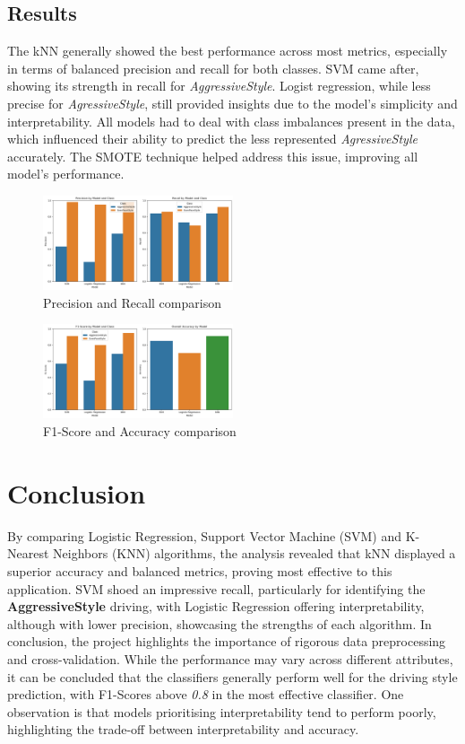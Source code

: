 \documentclass[10pt,journal,compsoc]{IEEEtran}
\begin{document}
\subsection{Results}
The kNN generally showed the best performance across most metrics, especially in terms of balanced precision and recall for both classes. SVM came after, 
showing its strength in recall for \textit{AggressiveStyle}. Logist regression, while less precise for \textit{AgressiveStyle}, still provided insights due 
to the model's simplicity and interpretability. All models had to deal with class imbalances present in the data, which influenced their ability to predict the less represented 
\textit{AgressiveStyle} accurately. The SMOTE technique helped address this issue, improving all model's performance. 

\begin{figure}[h]
    \centering
    \includegraphics[width=0.5\textwidth]{images/comparison1.png}
    \caption{Precision and Recall comparison}
    \label{fig:enter-label}
\end{figure}

\begin{figure}[h]
    \centering
    \includegraphics[width=0.5\textwidth]{images/comparison2.png}
    \caption{F1-Score and Accuracy comparison}
    \label{fig:enter-label}
\end{figure}

\section{Conclusion}
By comparing Logistic Regression, Support Vector Machine (SVM) and K-Nearest Neighbors (KNN) algorithms, the analysis revealed that kNN displayed a superior accuracy and balanced metrics, proving most effective to this application. SVM shoed an impressive recall, particularly for identifying the \textbf{AggressiveStyle} driving, with Logistic Regression offering interpretability, although with lower precision, showcasing the strengths of each algorithm.
In conclusion, the project highlights the importance of rigorous data preprocessing and cross-validation. While the performance may vary across different attributes, it can be concluded that the classifiers generally perform well for the driving style prediction, with F1-Scores above \textit{0.8} in the most effective classifier. One observation is that models prioritising interpretability tend to perform poorly, highlighting the trade-off between interpretability and accuracy.


\printbibliography
\end{document}
